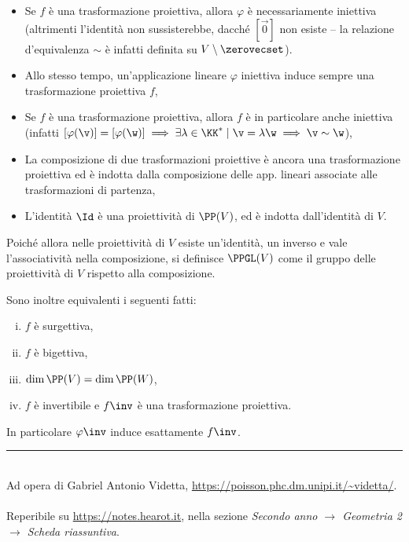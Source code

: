 \documentclass[10pt,landscape]{article}
\begin{document}
\begin{multicols}{3}
		\begin{itemize}
			\item Se $f$ è una trasformazione proiettiva, allora $\varphi$ è necessariamente
				iniettiva (altrimenti l'identità non sussisterebbe, dacché $[\vec 0]$ non
				esiste -- la relazione d'equivalenza $\sim$ è infatti definita su $V \setminus
				\zerovecset$).
			\item Allo stesso tempo, un'applicazione lineare $\varphi$ iniettiva induce
				sempre una trasformazione proiettiva $f$,
			\item Se $f$ è una trasformazione proiettiva, allora $f$ è in particolare anche
				iniettiva (infatti $[\varphi(\v)] = [\varphi(\w)] \implies \exists \lambda \in \KK^* \mid \v = \lambda \w \implies \v \sim \w$),
			\item La composizione di due trasformazioni proiettive è ancora una
				trasformazione proiettiva ed è indotta dalla composizione delle app.
				lineari associate alle trasformazioni di partenza,
			\item L'identità $\Id$ è una proiettività di $\PP(V)$, ed è indotta
				dall'identità di $V$.
		\end{itemize}
		
		Poiché allora nelle proiettività di $V$ esiste un'identità, un inverso e vale
		l'associatività nella composizione, si definisce $\PPGL(V)$ come il gruppo delle
		proiettività di $V$ rispetto alla composizione.
		
		Sono inoltre equivalenti i seguenti fatti:
		
		\begin{enumerate}[(i)]
			\item $f$ è surgettiva,
			\item $f$ è bigettiva,
			\item $\dim \PP(V) = \dim \PP(W)$,
			\item $f$ è invertibile e $f\inv$ è una trasformazione proiettiva.
		\end{enumerate}
		
		In particolare $\varphi\inv$ induce esattamente $f\inv$.		
		\vfill
		\hrule
		~\\
		Ad opera di Gabriel Antonio Videtta, \url{https://poisson.phc.dm.unipi.it/~videtta/}.
		~\\Reperibile su
		\url{https://notes.hearot.it}, nella sezione \textit{Secondo anno $\to$ Geometria 2 $\to$ Scheda riassuntiva}.
	\end{multicols}
	
\end{document}
